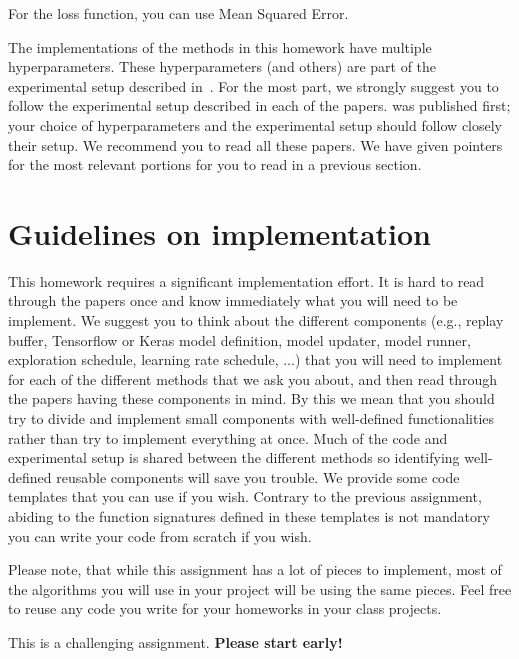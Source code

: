 \documentclass[12pt]{article}
\begin{document}
For the loss function, you can use Mean Squared Error. 

The implementations of the methods in this homework have multiple
hyperparameters.  These hyperparameters (and others) are part of the
experimental setup described in~\cite{mnih2013playing, mnih2015human}.
For the most part, we strongly suggest you to follow the experimental
setup described in each of the papers.  \cite{mnih2013playing,
  mnih2015human} was published first; your choice of hyperparameters
and the experimental setup should follow closely their setup.
We recommend you to read
all these papers.  We have given pointers for the most relevant portions for
you to read in a previous section.

\section*{Guidelines on implementation}

This homework requires a significant implementation effort. It is hard to read through the papers once and know immediately what you will need to be implement. We suggest you to think about the different components (e.g., replay buffer, Tensorflow or Keras model definition, model updater, model runner,
exploration schedule, learning rate schedule, ...) that you will need to implement for each of the different methods that we ask you about, and then read through the papers having these components in mind. By this we mean that you should try to divide and implement small components with well-defined functionalities rather than try to implement everything at once. Much of the code and experimental setup is shared between the different methods so identifying well-defined reusable components will 
save you trouble. We provide some code templates that you can use if you wish. Contrary to the previous assignment, abiding to the function signatures defined in these templates is not mandatory you can write your code from scratch if you wish. 

Please note, that while this assignment has a lot of pieces to implement, most of the algorithms you will use in your project will be using the same pieces. Feel free to reuse any code you write for your
homeworks in your class projects.


This is a challenging assignment. 
\textbf{Please start early!}

\nocite{*}


\end{document}
